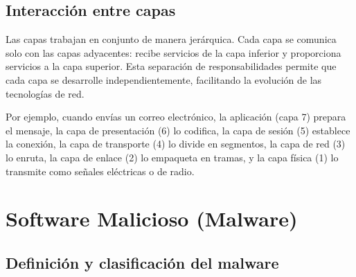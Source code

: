 \subsection{Interacción entre capas}

Las capas trabajan en conjunto de manera jerárquica. Cada capa se comunica solo con las capas adyacentes: recibe servicios de la capa inferior y proporciona servicios a la capa superior. Esta separación de responsabilidades permite que cada capa se desarrolle independientemente, facilitando la evolución de las tecnologías de red.

Por ejemplo, cuando envías un correo electrónico, la aplicación (capa 7) prepara el mensaje, la capa de presentación (6) lo codifica, la capa de sesión (5) establece la conexión, la capa de transporte (4) lo divide en segmentos, la capa de red (3) lo enruta, la capa de enlace (2) lo empaqueta en tramas, y la capa física (1) lo transmite como señales eléctricas o de radio.

\section{Software Malicioso (Malware)}

\subsection{Definición y clasificación del malware}

